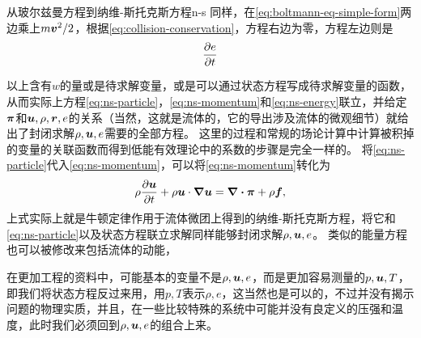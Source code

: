\begin{back}{从玻尔兹曼方程到纳维-斯托克斯方程}{n-s}
    同样，在\eqref{eq:boltmann-eq-simple-form}两边乘上$m \vb*{v}^2 / 2$，根据\eqref{eq:collision-conservation}，方程右边为零，方程左边则是
    \begin{equation}
        \pdv{e}{t} %
        \label{eq:ns-energy}
    \end{equation}

    以上含有$w$的量或是待求解变量，或是可以通过状态方程写成待求解变量的函数，从而实际上方程\eqref{eq:ns-particle}，\eqref{eq:ns-momentum}和\eqref{eq:ns-energy}联立，并给定$\vb*{\pi}$和$\vb*{u}, \rho, \vb*{r}, e$的关系（当然，这就是流体的，它的导出涉及流体的微观细节）就给出了封闭求解$\rho, \vb*{u}, e$需要的全部方程。
    这里的过程和常规的场论计算中计算被积掉的变量的关联函数而得到低能有效理论中的系数的步骤是完全一样的。
    将\eqref{eq:ns-particle}代入\eqref{eq:ns-momentum}，可以将\eqref{eq:ns-momentum}转化为
    \begin{equation}
        \rho \pdv{\vb*{u}}{t} + \rho \vb*{u} \cdot \grad{\vb*{u}} = \div{\vb*{\pi}} + \rho \vb*{f},
    \end{equation}
    上式实际上就是牛顿定律作用于流体微团上得到的纳维-斯托克斯方程，将它和\eqref{eq:ns-particle}以及状态方程联立求解同样能够封闭求解$\rho, \vb*{u}, e$。
    类似的能量方程也可以被修改来包括流体的动能，%

    在更加工程的资料中，可能基本的变量不是$\rho, \vb*{u}, e$，而是更加容易测量的$p, \vb*{u}, T$，即我们将状态方程反过来用，用$p, T$表示$\rho, e$，这当然也是可以的，不过并没有揭示问题的物理实质，并且，在一些比较特殊的系统中可能并没有良定义的压强和温度，此时我们必须回到$\rho, \vb*{u}, e$的组合上来。
\end{back}